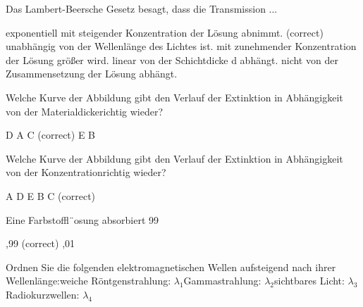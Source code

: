 \documentclass[11pt]{exam}
\begin{document}
\setlength{\voffset}{-0.5in}
\setlength{\headsep}{5pt}

\hspace{2mm}
 \hspace{5mm}
\vspace{4mm}

\begin{questions}

\question Das Lambert-Beersche Gesetz besagt, dass die Transmission ...

\begin{choices}
	\choice exponentiell mit steigender Konzentration der Lösung abnimmt. (correct)
	\choice unabhängig von der Wellenlänge des Lichtes ist.
	\choice mit zunehmender Konzentration der Lösung größer wird.
	\choice linear von der Schichtdicke d abhängt.
	\choice nicht von der Zusammensetzung der Lösung abhängt.
\end{choices}

\vspace{3mm}\question Welche Kurve der Abbildung gibt den Verlauf der Extinktion in Abhängigkeit von der Materialdickerichtig wieder?

\begin{choices}
	\choice D
	\choice A
	\choice C (correct)
	\choice E
	\choice B
\end{choices}

\vspace{3mm}\question Welche Kurve der Abbildung gibt den Verlauf der Extinktion in Abhängigkeit von der Konzentrationrichtig wieder?

\begin{choices}
	\choice A
	\choice D
	\choice E
	\choice B
	\choice C (correct)
\end{choices}

\vspace{3mm}\question Eine Farbstoffl¨osung absorbiert 99 %

\begin{choices}
	,99
	 (correct)
	,01
\end{choices}

\vspace{3mm}\question Ordnen Sie die folgenden elektromagnetischen Wellen aufsteigend nach ihrer Wellenlänge:weiche Röntgenstrahlung: \( \lambda_1 \)Gammastrahlung: \( \lambda_2 \)sichtbares Licht: \( \lambda_3 \)Radiokurzwellen: \( \lambda_4 \)


\end{questions}
\end{document}
